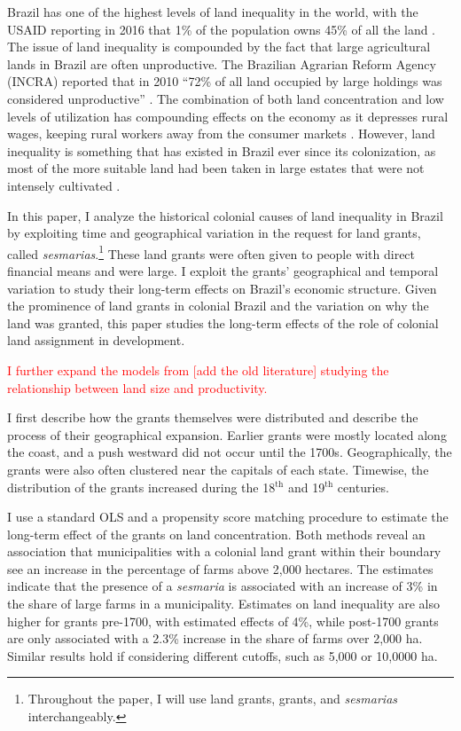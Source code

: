 \documentclass[11pt]{article}
\newcommand{\red}[1]{\textcolor{red}{#1}}
\begin{document}
Brazil has one of the highest levels of land inequality in the world, with the USAID reporting in 2016 that 1\% of the population owns 45\% of all the land \parencite{Usaid2016-xs}. 
The issue of land inequality is compounded by the fact that large agricultural lands in Brazil are often unproductive.
The Brazilian Agrarian Reform Agency (INCRA) reported that in 2010 ``72\% of all land occupied by large holdings was considered unproductive'' \parencite{Carlson2019-mk}.
The combination of both land concentration and low levels of utilization has compounding effects on the economy as it depresses rural wages, keeping rural workers away from the consumer markets \parencite[p.~1]{De_Oliveira_Andrade1980-xz}.
However, land inequality is something that has existed in Brazil ever since its colonization, as most of the more suitable land had been taken in large estates that were not intensely cultivated \parencite[p.~53]{Mueller1995-gi}. 

In this paper, I analyze the historical colonial causes of land inequality in Brazil by exploiting time and geographical variation in the request for land grants, called \textit{sesmarias}.\footnote{Throughout the paper, I will use land grants, grants, and \textit{sesmarias} interchangeably.}
These land grants were often given to people with direct financial means and were large. 
I exploit the grants' geographical and temporal variation to study their long-term effects on Brazil's economic structure.  
Given the prominence of land grants in colonial Brazil and the variation on why the land was granted, this paper studies the long-term effects of the role of colonial land assignment in development.  

\red{I further expand the models from [add the old literature] studying the relationship between land size and productivity.}

I first describe how the grants themselves were distributed and describe the process of their geographical expansion. 
Earlier grants were mostly located along the coast, and a push westward did not occur until the 1700s. 
Geographically, the grants were also often clustered near the capitals of each state.
Timewise, the distribution of the grants increased during the 18$^\text{th}$ and 19$^\text{th}$ centuries.

I use a standard OLS and a propensity score matching procedure to estimate the long-term effect of the grants on land concentration. 
Both methods reveal an association that municipalities with a colonial land grant within their boundary see an increase in the percentage of farms above 2,000 hectares.
The estimates indicate that the presence of a \textit{sesmaria} is associated with an increase of 3\% in the share of large farms in a municipality. 
Estimates on land inequality are also higher for grants pre-1700, with estimated effects of 4\%, while post-1700 grants are only associated with a 2.3\% increase in the share of farms over 2,000 ha.
Similar results hold if considering different cutoffs, such as 5,000 or 10,0000 ha. 
\end{document}

